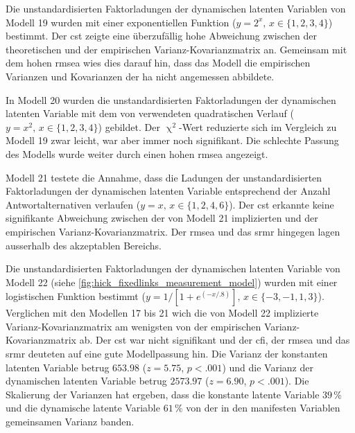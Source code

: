 \documentclass[11pt, twoside, a4paper]{book}		%
\begin{document}
Die unstandardisierten Faktorladungen der dynamischen latenten Variablen von Modell 19 wurden mit einer exponentiellen Funktion ($y=2^x,\,x\in\{1, 2, 3, 4\}$) bestimmt. Der \gls{cst} zeigte eine überzufällig hohe Abweichung zwischen der theoretischen und der empirischen Var\-ianz-Ko\-var\-ianz\-ma\-trix an. Gemeinsam mit dem hohen \gls{rmsea} wies dies darauf hin, dass das Modell die empirischen Varianzen und Kovarianzen der \gls{ha} nicht angemessen abbildete.

In Modell 20 wurden die unstandardisierten Faktorladungen der dynamischen latenten Variable mit dem von \citet{Schweizer2006b} verwendeten quadratischen Verlauf ($y=x^2,\,x\in\{1, 2, 3, 4\}$) gebildet. Der $\upchi^2$-Wert reduzierte sich im Vergleich zu Modell 19 zwar leicht, war aber immer noch signifikant. Die schlechte Passung des Modells wurde weiter durch einen hohen \gls{rmsea} angezeigt.

Modell 21 testete die Annahme, dass die Ladungen der unstandardisierten Faktorladungen der dynamischen latenten Variable entsprechend der Anzahl Antwortalternativen verlaufen ($y=x,\,x\in\{1, 2, 4, 6\}$). Der \gls{cst} erkannte keine signifikante Abweichung zwischen der von Modell 21 implizierten und der empirischen Var\-ianz-Ko\-var\-ianz\-ma\-trix. Der \gls{rmsea} und das \gls{srmr} hingegen lagen ausserhalb des akzeptablen Bereichs.

Die unstandardisierten Faktorladungen der dynamischen latenten Variable von Modell 22 (siehe \autoref{fig:hick_fixedlinks_measurement_model}) wurden mit einer logistischen Funktion bestimmt ($y={1}/[{1 + e^{(-x/.8)}}],\,x\in\{-3,-1,1,3\}$). Verglichen mit den Modellen 17 bis 21 wich die von Modell 22 implizierte Var\-ianz-Ko\-var\-ianz\-ma\-trix am wenigsten von der empirischen Var\-ianz-Ko\-var\-ianz\-ma\-trix ab. Der \gls{cst} war nicht signifikant und der \gls{cfi}, der \gls{rmsea} und das \gls{srmr} deuteten auf eine gute Modellpassung hin. 
Die Varianz der konstanten latenten Variable betrug $653.98$ ($z=5.75$, $p<.001$) und die Varianz der dynamischen latenten Variable betrug $2573.97$ ($z=6.90$, $p<.001$). Die Skalierung der Varianzen \citep{Schweizer2011a} hat ergeben, dass die konstante latente Variable $39\,\%$ und die dynamische latente Variable $61\,\%$ von der in den manifesten Variablen gemeinsamen Varianz banden.
\end{document}
